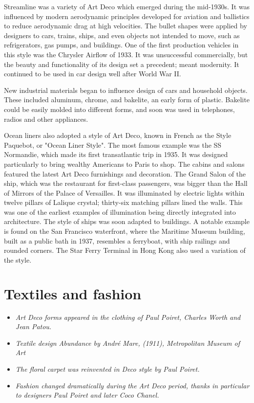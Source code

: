 Streamline was a variety of Art Deco which emerged during the mid-1930s.
It was influenced by modern aerodynamic principles developed for
aviation and ballistics to reduce aerodynamic drag at high velocities.
The bullet shapes were applied by designers to cars, trains, ships, and
even objects not intended to move, such as refrigerators, gas pumps, and
buildings. One of the first production vehicles in this style was the
Chrysler Airflow of 1933. It was unsuccessful commercially, but the
beauty and functionality of its design set a precedent; meant modernity.
It continued to be used in car design well after World War II.

New industrial materials began to influence design of cars and household
objects. These included aluminum, chrome, and bakelite, an early form of
plastic. Bakelite could be easily molded into different forms, and soon
was used in telephones, radios and other appliances.

Ocean liners also adopted a style of Art Deco, known in French as the
Style Paquebot, or "Ocean Liner Style". The most famous example was the
SS Normandie, which made its first transatlantic trip in 1935. It was
designed particularly to bring wealthy Americans to Paris to shop. The
cabins and salons featured the latest Art Deco furnishings and
decoration. The Grand Salon of the ship, which was the restaurant for
first-class passengers, was bigger than the Hall of Mirrors of the
Palace of Versailles. It was illuminated by electric lights within
twelve pillars of Lalique crystal; thirty-six matching pillars lined the
walls. This was one of the earliest examples of illumination being
directly integrated into architecture. The style of ships was soon
adapted to buildings. A notable example is found on the San Francisco
waterfront, where the Maritime Museum building, built as a public bath
in 1937, resembles a ferryboat, with ship railings and rounded corners.
The Star Ferry Terminal in Hong Kong also used a variation of the style.

\section{Textiles and fashion}\label{textiles-and-fashion}

\begin{itemize}
\item
  \emph{Art Deco forms appeared in the clothing of Paul Poiret, Charles
  Worth and Jean Patou.}
\item
  \emph{Textile design Abundance by André Mare, (1911), Metropolitan
  Museum of Art}
\item
  \emph{The floral carpet was reinvented in Deco style by Paul Poiret.}
\item
  \emph{Fashion changed dramatically during the Art Deco period, thanks
  in particular to designers Paul Poiret and later Coco Chanel.}
\end{itemize}

